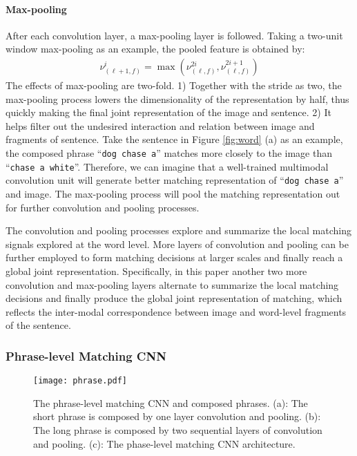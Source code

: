 \documentclass[10pt,twocolumn,letterpaper]{article}
\begin{document}
\vspace{-10pt}
\paragraph{Max-pooling} After each convolution layer, a max-pooling layer is followed. Taking a two-unit window max-pooling as an example, the pooled feature is obtained by:
 \begin{equation}
\label{eq_maxpooling}
\begin{split}
\nu^i_{(\ell+1,f)} = \max(\nu^{2i}_{(\ell,f)},\nu^{2i+1}_{(\ell,f)})
\end{split}
\end{equation}
The effects of max-pooling are two-fold. 1) Together with the stride as two, the max-pooling process lowers the  dimensionality of the representation by half, thus quickly making the final joint representation of the image and sentence. 2) It helps filter out the undesired interaction and relation between image and fragments of sentence. Take the sentence in Figure \ref{fig:word} (a) as an example, the composed phrase ``\texttt{\small dog chase a}'' matches more closely to the image than ``\texttt{\small chase a white}''. Therefore, we can imagine that a well-trained multimodal convolution unit will generate better matching representation of ``\texttt{\small dog chase a}'' and image. The max-pooling process will pool the matching representation out for further convolution and pooling processes.

The convolution and pooling processes explore and summarize the local matching signals explored at the word level. More layers of convolution and pooling can be further employed to form matching decisions at larger scales and finally reach a global joint representation. Specifically, in this paper another two more convolution and max-pooling layers alternate to summarize the local matching decisions and finally produce the global joint representation of matching, which reflects the inter-modal correspondence between image and word-level fragments of the sentence.





\subsubsection{Phrase-level Matching CNN}
\begin{figure}[t!]
\begin{center}
\texttt{[image: phrase.pdf]}

\end{center}
   \caption{The phrase-level matching CNN and composed phrases. (a): The short phrase is composed by one layer convolution and pooling. (b): The long phrase is composed by two sequential layers of convolution and pooling. (c): The phase-level matching CNN architecture.}
\label{fig:phrase}

\end{figure}
\end{document}
